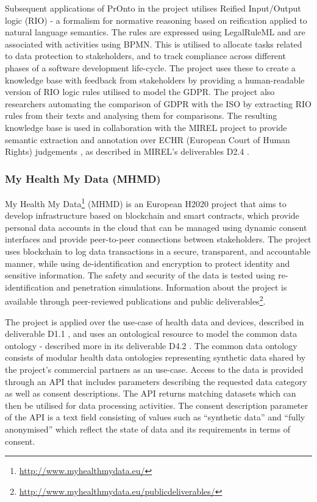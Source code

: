Subsequent applications of PrOnto in the project utilises Reified Input/Output logic (RIO) \cite{robaldo_reified_2017} - a formalism for normative reasoning based on reification applied to natural language semantics. The rules are expressed using LegalRuleML and are associated with activities using BPMN. This is utilised to allocate tasks related to data protection to stakeholders, and to track compliance across different phases of a software development life-cycle.
The project uses these to create a knowledge base \cite{bartolini_agile_2019} with feedback from stakeholders by providing a human-readable version of RIO logic rules utilised to model the GDPR. 
The project also researchers automating the comparison of GDPR with the ISO by extracting RIO rules from their texts and analysing them for comparisons.
The resulting knowledge base is used in collaboration with the MIREL project to provide semantic extraction and annotation over ECHR (European Court of Human Rights) judgements \cite{cardellino_legal_2017}, as described in MIREL's deliverables D2.4 \cite{robaldo_livio_d2.4_2017}.
\subsubsection{My Health My Data (MHMD)}
My Health My Data\footnote{\url{http://www.myhealthmydata.eu/}} (MHMD) is an European H2020 project that aims to develop infrastructure based on blockchain and smart contracts, which provide personal data accounts in the cloud that can be managed using dynamic consent interfaces and provide peer-to-peer connections between stakeholders. The project uses blockchain to log data transactions in a secure, transparent, and accountable manner, while using de-identification and encryption to protect identity and sensitive information. The safety and security of the data is tested using re-identification and penetration simulations.
Information about the project is available through peer-reviewed publications and public deliverables\footnote{\url{http://www.myhealthmydata.eu/publicdeliverables/}}.

The project is applied over the use-case of health data and devices, described in deliverable D1.1 \cite{noauthor_d1.1_initial-list--main-requirements.pdf_nodate}, and uses an ontological resource to model the common data ontology - described more in its deliverable D4.2 \cite{teodoro_d4.2-mhmd-ontological-resources.pdf_2018}. The common data ontology consists of modular health data ontologies representing synthetic data shared by the project's commercial partners as an use-case.
Access to the data is provided through an API that includes parameters describing the requested data category as well as consent descriptions. The API returns matching datasets which can then be utilised for data processing activities. The consent description parameter of the API is a text field consisting of values such as ``synthetic data'' and ``fully anonymised'' which reflect the state of data and its requirements in terms of consent. 


